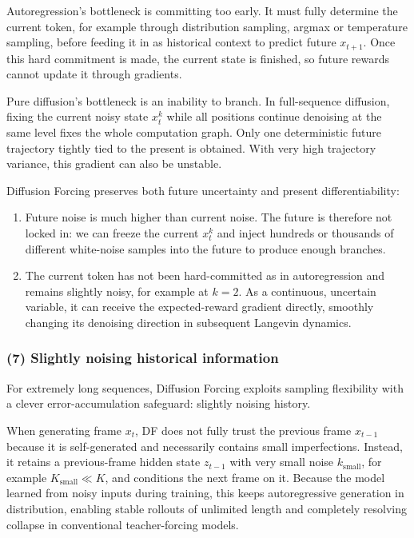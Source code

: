 Autoregression's bottleneck is committing too early. It must fully determine the current token, for example through distribution sampling, argmax or temperature sampling, before feeding it in as historical context to predict future \(x_{t+1}\). Once this hard commitment is made, the current state is finished, so future rewards cannot update it through gradients.

Pure diffusion's bottleneck is an inability to branch. In full-sequence diffusion, fixing the current noisy state \(x_t^k\) while all positions continue denoising at the same level fixes the whole computation graph. Only one deterministic future trajectory tightly tied to the present is obtained. With very high trajectory variance, this gradient can also be unstable.

Diffusion Forcing preserves both future uncertainty and present differentiability:

\begin{enumerate}
\def\labelenumi{\arabic{enumi}.}
\tightlist
\item
  Future noise is much higher than current noise. The future is therefore not locked in: we can freeze the current \(x_t^k\) and inject hundreds or thousands of different white-noise samples into the future to produce enough branches.
\item
  The current token has not been hard-committed as in autoregression and remains slightly noisy, for example at \(k=2\). As a continuous, uncertain variable, it can receive the expected-reward gradient directly, smoothly changing its denoising direction in subsequent Langevin dynamics.
\end{enumerate}

\hypertarget{slightly-noising-historical-information}{%
\subsubsection{(7) Slightly noising historical information}\label{slightly-noising-historical-information}}

For extremely long sequences, Diffusion Forcing exploits sampling flexibility with a clever error-accumulation safeguard: slightly noising history.

When generating frame \(x_t\), DF does not fully trust the previous frame \(x_{t-1}\) because it is self-generated and necessarily contains small imperfections. Instead, it retains a previous-frame hidden state \(z_{t-1}\) with very small noise \(k_{\mathrm{small}}\), for example \(K_{\mathrm{small}}\ll K\), and conditions the next frame on it. Because the model learned from noisy inputs during training, this keeps autoregressive generation in distribution, enabling stable rollouts of unlimited length and completely resolving collapse in conventional teacher-forcing models.


